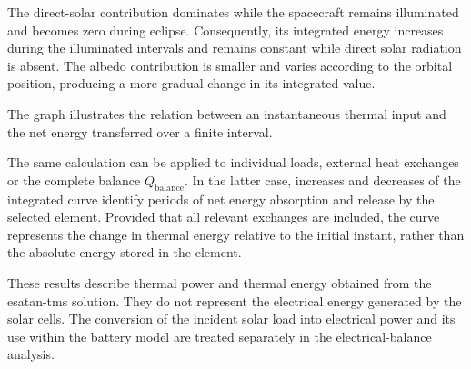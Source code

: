 The direct-solar contribution dominates while the spacecraft remains
illuminated and becomes zero during eclipse. Consequently, its integrated
energy increases during the illuminated intervals and remains constant while
direct solar radiation is absent. The albedo contribution is smaller and
varies according to the orbital position, producing a more gradual change in
its integrated value.

The graph illustrates the relation between an instantaneous thermal input and
the net energy transferred over a finite interval.

\begin{samepage}
The same calculation can be applied to individual loads, external heat
exchanges or the complete balance \(Q_{\mathrm{balance}}\). In the latter
case, increases and decreases of the integrated curve identify periods of net
energy absorption and release by the selected element. Provided that all
relevant exchanges are included, the curve represents the change in thermal
energy relative to the initial instant, rather than the absolute energy stored
in the element.

These results describe thermal power and thermal energy obtained from the
\acrshort{esatan-tms} solution. They do not represent the electrical energy
generated by the solar cells. The conversion of the incident solar load into
electrical power and its use within the battery model are treated separately
in the electrical-balance analysis.
\end{samepage}